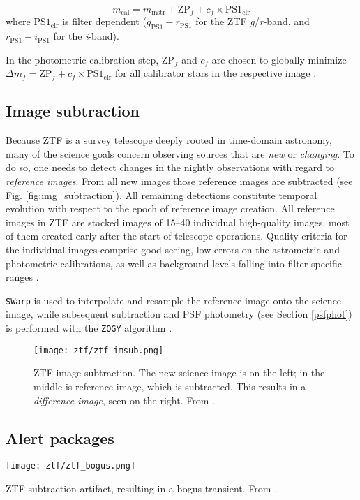 \begin{equation}
m_\text{cal} = m_\text{instr} + \text{ZP}_f + c_f \times \text{PS1}_\text{clr}
\end{equation}
where $\text{PS1}_\text{clr}$ is filter dependent ($g_\text{PS1}-r_\text{PS1}$ for the ZTF \textit{g}/\textit{r}-band, and $r_\text{PS1}-i_\text{PS1}$ for the \textit{i}-band).

In the photometric calibration step, $\text{ZP}_f$ and $c_f$ are chosen to globally minimize $\Delta m_f = \text{ZP}_f + c_f \times \text{PS1}_\text{clr}$ for all calibrator stars in the respective image \cite{Masci2019a}.

\subsection{Image subtraction} \label{ztf_image_subtraction}
Because ZTF is a survey telescope deeply rooted in time-domain astronomy, many of the science goals concern observing sources that are \textit{new} or \textit{changing}. To do so, one needs to detect changes in the nightly observations with regard to \textit{reference images}. From all new images those reference images are subtracted (see Fig. \ref{fig:img_subtraction}). All remaining detections constitute temporal evolution with respect to the epoch of reference image creation. All reference images in ZTF are stacked images of 15--40 individual high-quality images, most of them created early after the start of telescope operations. Quality criteria for the individual images comprise good seeing, low errors on the astrometric and photometric calibrations, as well as background levels falling into filter-specific ranges \cite{Masci2019}.

\texttt{SWarp}  is used to interpolate and resample the reference image onto the science image, while subsequent subtraction and PSF photometry (see Section \ref{psfphot}) is performed with the \texttt{ZOGY} algorithm .

\begin{figure}[h!]
    \texttt{[image: ztf/ztf\_imsub.png]}
    \caption[ZTF image subtraction]{ZTF image subtraction. The new science image is on the left; in the middle is reference image, which is subtracted. This results in a \textit{difference image}, seen on the right. From \cite{Mahabal2019}.}
\end{figure}

\subsection{Alert packages} \label{ztf_alerts}
\begin{marginfigure}
    \texttt{[image: ztf/ztf\_bogus.png]}
    \caption[ZTF subtraction artifact]{ZTF subtraction artifact, resulting in a bogus transient. From \cite{Mahabal2019}.}
\end{marginfigure}

